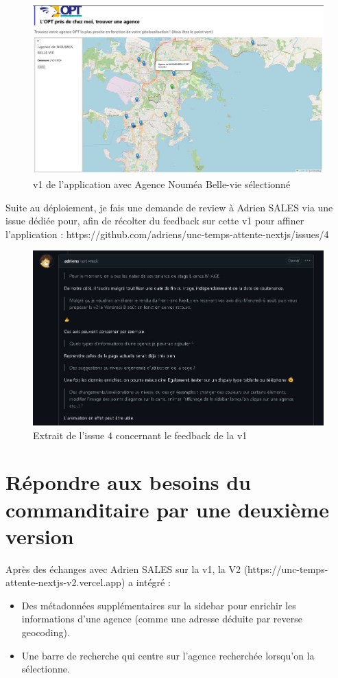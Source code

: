 \documentclass[12pt,a4paper]{report}
\begin{document}
\begin{figure}[h] %
    \centering
    \includegraphics[width=1\textwidth]{ressources_rapport/app_opt_v1.JPG}
    \caption{v1 de l'application avec Agence Nouméa Belle-vie sélectionné}
    \label{fig:exemple}
\end{figure}
\vspace{1cm}
Suite au déploiement, je fais une demande de review  à Adrien SALES via une issue dédiée pour, afin de récolter du feedback sur cette v1 pour affiner l'application : https://github.com/adriens/unc-temps-attente-nextjs/issues/4

\begin{figure}[h] %
    \centering
    \includegraphics[width=1\textwidth]{ressources_rapport/extrait_issue_4.JPG}
    \caption{Extrait de l'issue 4 concernant le feedback de la v1}
    \label{fig:exemple}
\end{figure}
\newpage

\section{Répondre aux besoins du commanditaire par une deuxième version}
Après des échanges avec Adrien SALES sur la v1, la V2 (https://unc-temps-attente-nextjs-v2.vercel.app) a intégré :
\begin{itemize}
    \item Des métadonnées supplémentaires sur la sidebar pour enrichir les informations d'une agence (comme une adresse déduite par reverse geocoding).
    \item Une barre de recherche qui centre sur l'agence recherchée lorsqu'on la sélectionne.
\end{itemize}
\end{document}
